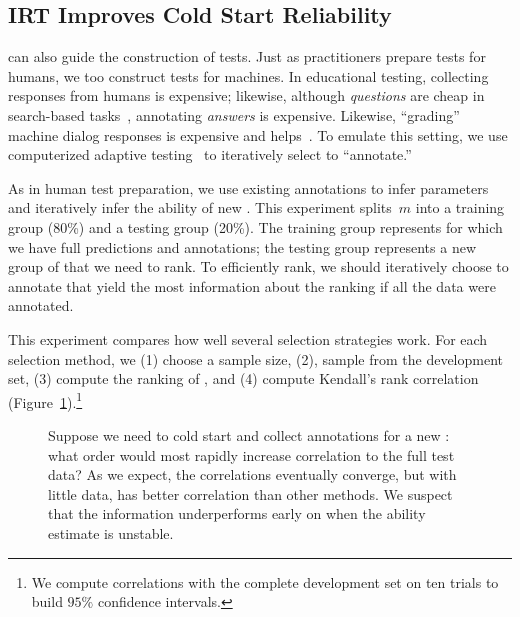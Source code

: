\subsection{IRT Improves Cold Start Reliability}
\label{ch:isicle:sampling}

\irt{} can also guide the construction of tests.
Just as \irt{} practitioners prepare tests for humans, we too construct tests for machines.
In educational testing, collecting responses from humans is expensive; likewise, although \emph{questions} are cheap in search-based \qa{} tasks~\citep{Nguyen2016MSMA,kwiatkowski2019nq}, annotating \emph{answers} is expensive.
Likewise, ``grading'' machine dialog responses is expensive and \irt{} helps~\citep{sedoc2020irt}.
To emulate this setting, we use computerized adaptive testing~\citep{weiss1984cat} to iteratively select \squad{} \itms{} to ``annotate.''

As in human test preparation, we use existing annotations to infer
\itm{} parameters and iteratively infer the ability of new \subjs{}.
This experiment splits~$m$ \subjs{} into a training group (80\%) and a
testing group (20\%).
The training group represents \subjs{} for which we have full \itm{}
predictions and annotations; the testing group represents a new group
of \subjs{} that we need to rank.
To efficiently rank, we should iteratively choose \itms{} to annotate that yield the most information about the ranking if all the data were annotated.

This experiment compares how well several \itm{} selection strategies work.
For each selection method, we (1) choose a sample size, (2), sample
from the development set, (3) compute the ranking of \subjs{}, and (4)
compute Kendall's rank correlation
(Figure~\ref{fig:stability:sampling}).\footnote{We compute correlations with the complete development set on ten trials to build $95\%$ confidence intervals.}


\begin{figure}[t]
    \centering
    \caption{
        Suppose we need to cold start and collect annotations for a new \subj{}: what order would most rapidly increase correlation to the full test data?
        As we expect, the correlations eventually converge, but with little data, \irt{} has better correlation than other methods.
        We suspect that the \irt{} information underperforms early on
        when the \subj{} ability estimate is unstable.
    }
    \label{fig:stability:sampling}
\end{figure}


